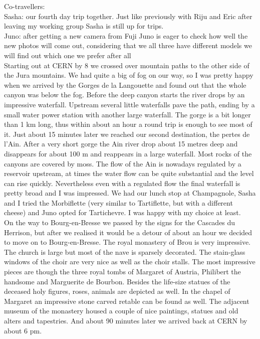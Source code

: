 Co-travellers:\\
Sasha: our fourth day trip together. Just like previously with Riju and Eric after leaving my working group Sasha is still up for trips. \\
Juno: after getting a new camera from Fuji Juno is eager to check how well the new photos will come out, considering that we all three have different models we will find out which one we prefer after all\\

Starting out at CERN by 8 we crossed over mountain paths to the other side of the Jura mountains. We had quite a big of fog on our way, so I was pretty happy when we arrived by the Gorges de la Langouette and found out that the whole canyon was below the fog. Before the deep canyon starts the river drops by an impressive waterfall. Upstream several little waterfalls pave the path, ending by a small water power station with another large waterfall. The gorge is a bit longer than 1 km long, thus within about an hour a round trip is enough to see most of it. Just about 15 minutes later we reached our second destination, the pertes de l'Ain. After a very short gorge the Ain river drop about 15 metres deep and disappears for about 100 m and reappears in a large waterfall. Most rocks of the canyons are covered by moss. The flow of the Ain is nowadays regulated by a reservoir upstream, at times the water flow can be quite substantial and the level can rise quickly. Nevertheless even with a regulated flow the final waterfall is pretty broad and I was impressed. We had our lunch stop at Champagnole, Sasha and I tried the Morbiflette (very similar to Tartiflette, but with a different cheese) and Juno opted for Tartichevre. I was happy with my choice at least.\\
 On the way to Bourg-en-Bresse we passed by the signs for the Cascades du Herrison, but after we realised it would be a detour of about an hour we decided to move on to Bourg-en-Bresse. The royal monastery of Brou is very impressive. The church is large but most of the nave is sparsely decorated. The stain-glass windows of the choir are very nice as well as the choir stalls. The most impressive pieces are though the three royal tombs of Margaret of Austria, Philibert the handsome and Marguerite de Bourbon. Besides the life-size statues of the deceased holy figures, roses, animals are depicted as well. In the chapel of Margaret an impressive stone carved retable can be found as well. The adjacent museum of the monastery housed a couple of nice paintings, statues and old alters and tapestries. And about 90 minutes later we arrived back at CERN by about 6 pm.\\ 

